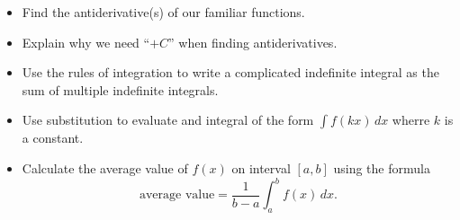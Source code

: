 \documentclass[
]{book}
\providecommand{\tightlist}{%
  \setlength{\itemsep}{0pt}\setlength{\parskip}{0pt}}
\begin{document}
\begin{itemize}
\tightlist
\item
  Find the antiderivative(s) of our familiar functions.
\item
  Explain why we need ``\(+ C\)'' when finding antiderivatives.
\item
  Use the rules of integration to write a complicated indefinite integral as the sum of multiple indefinite integrals.
\item
  Use substitution to evaluate and integral of the form \(\int f(kx) \, dx\) wherre \(k\) is a constant.
\item
  Calculate the average value of \(f(x)\) on interval \([a,b]\) using the formula
  \[
  \mbox{average value} = \frac{1}{b-a} \int_a^b f(x) \, dx.
  \]
\end{itemize}
\end{document}
